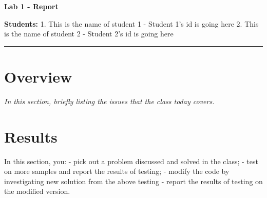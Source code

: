 \documentclass[12pt]{article}
\newcommand\tab[1][1cm]{\hspace*{#1}}
\begin{document}
\begin{center}
    \textbf{\Large Lab 1 - Report}
\end{center}
\textbf{Students:}\newline
\tab    1. This is the name of student 1 - Student 1's id is going here\newline
\tab    2. This is the name of student 2 - Student 2's id is going here\newline
                
\hrule height 0.0001cm 

\section{Overview}
\textit{In this section, briefly listing the issues that the class today covers.}

\section{Results}
In this section, you:\newline
\tab - pick out a problem discussed and solved in the class; \newline
\tab - test on more samples and report the results of testing; \newline
\tab - modify the code by investigating new solution from the above testing \newline
\tab - report the results of testing on the modified version.
\end{document}
